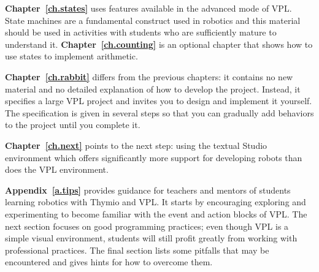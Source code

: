 \textbf{Chapter~\ref{ch.states}} uses features available in the advanced mode of VPL.
State machines are a fundamental construct used in robotics and this material
should be used in activities with students who are sufficiently mature to understand it.
\textbf{Chapter~\ref{ch.counting}} is an optional chapter that shows
how to use states to implement arithmetic.

\textbf{Chapter~\ref{ch.rabbit}} differs from the previous chapters: it
contains no new material and no detailed explanation of how to develop
the project. Instead, it specifies a large VPL project and invites you
to design and implement it yourself. The specification is given in
several steps so that you can gradually add behaviors to the project
until you complete it.

\textbf{Chapter~\ref{ch.next}} points to the next step: using
the textual Studio environment which offers significantly more support for
developing robots than does the VPL environment.

\textbf{Appendix~\ref{a.tips}} provides guidance for teachers and mentors
of students learning robotics with Thymio and VPL.
It starts by encouraging exploring and experimenting
to become familiar with the event and action blocks of VPL.
The next section focuses on good programming practices;
even though VPL is a simple visual environment,
students will still profit greatly from working with
professional practices.
The final section lists some pitfalls that may be encountered
and gives hints for how to overcome them.
